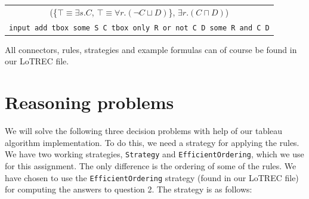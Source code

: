 \documentclass[11pt]{article} %
\begin{document}
\begin{table}[h]
\begin{center}
\begin{tabular}{c}
(\{$\top \equiv \exists s.C$, $\top \equiv \forall r.(\neg C \sqcup D)$\}, $\exists r.(C \sqcap D)$)\\
\texttt{input add tbox some S C tbox only R or not C D some R and C D}\\
\end{tabular}
\end{center}
\end{table}

All connectors, rules, strategies and example formulas can of course be found in our LoTREC file.

\section{Reasoning problems}
\label{sec:reasoning}

We will solve the following three decision problems with help of our tableau algorithm implementation. To do this, we need a strategy for applying the rules. We have two working strategies, \texttt{Strategy} and \texttt{EfficientOrdering}, which we use for this assignment. The only difference is the ordering of some of the rules. We have chosen to use the \texttt{EfficientOrdering} strategy (found in our LoTREC file) for computing the answers to question 2. The strategy is as follows:
\end{document}
